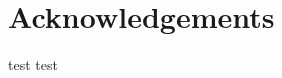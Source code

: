 
\chapter*{Acknowledgements}
\label{ch:Acknowledgements}
\thispagestyle{empty}
test test
\cleardoublepage
\newpage \thispagestyle{empty}
